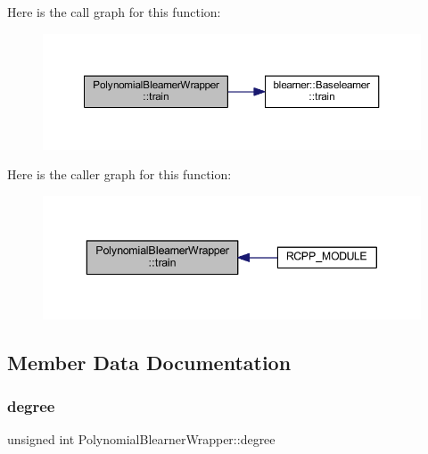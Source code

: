 Here is the call graph for this function\+:\nopagebreak
\begin{figure}[H]
\begin{center}
\leavevmode
\includegraphics[width=350pt]{class_polynomial_blearner_wrapper_a7e6cdfd15c354b76ddd217c76b3cfbc5_cgraph}
\end{center}
\end{figure}
Here is the caller graph for this function\+:\nopagebreak
\begin{figure}[H]
\begin{center}
\leavevmode
\includegraphics[width=343pt]{class_polynomial_blearner_wrapper_a7e6cdfd15c354b76ddd217c76b3cfbc5_icgraph}
\end{center}
\end{figure}


\subsection{Member Data Documentation}
\mbox{\label{class_polynomial_blearner_wrapper_aaf529e97ffbb9cdd2822957b5f6b5b0c}} 
\subsubsection{\texorpdfstring{degree}{degree}}
{\footnotesize\ttfamily unsigned int Polynomial\+Blearner\+Wrapper\+::degree\hspace{0.3cm}{\ttfamily [private]}}

\mbox{\label{class_polynomial_blearner_wrapper_a4d3becc6b8cdfe2e1406611aad5b0d2c}} 
